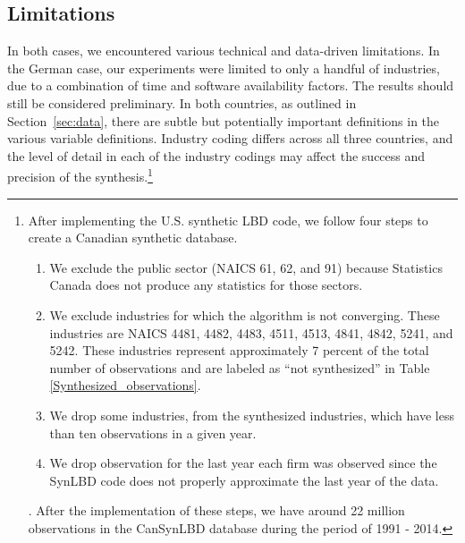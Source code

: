 \subsection{Limitations}

In both cases, we encountered various technical and data-driven limitations. In the German case, our experiments were limited to only a handful of industries, due to a combination of time and software availability factors. The results should still be considered preliminary. In both countries, as outlined in Section~\ref{sec:data}, there are subtle but potentially important definitions in the various variable definitions. Industry coding differs across all three countries, and the level of detail in each of the industry codings may affect the success and precision of the synthesis.\footnote{




After implementing the U.S. synthetic LBD code, we follow four steps to create a Canadian synthetic database. \begin{enumerate}
    \item We exclude the public sector (NAICS 61, 62, and 91) because Statistics Canada does not produce any statistics for those sectors.
    \item We exclude industries for which the algorithm is not converging. These industries are NAICS 4481,    4482,     4483,     4511,     4513,     4841,     4842,     5241, and 5242. These industries represent approximately 7 percent of the total number of observations and are labeled as ``not synthesized'' in Table \ref{Synthesized_observations}.
    \item We drop some industries, from the synthesized industries, which have less than ten observations in a given year.
    \item We drop observation for the last year each firm was observed since the SynLBD code does not properly approximate the last year of the data.
\end{enumerate}. 
After the implementation of these steps, we have around 22 million observations in the CanSynLBD database during the period of 1991 - 2014.

}
